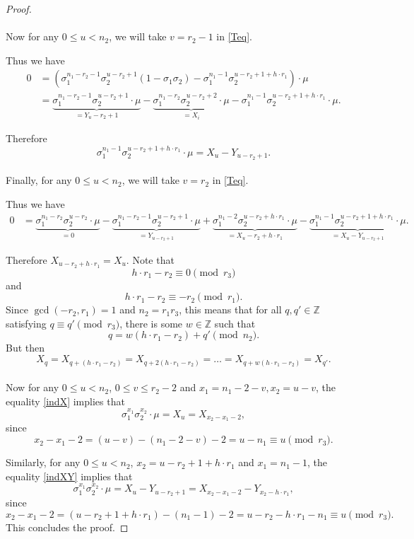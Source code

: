 \documentclass[12pt,a4paper]{article}
\theoremstyle{definition}
\newcommand{\Z}{\mathbb{Z}}
\begin{document}
\begin{proof}
\paragraph*{}
Now for any $0\leq u< n_2$, we will take $v=r_2-1$ in \eqref{Teq}. 

Thus we have 
\begin{align*}
0&=\left(\sigma_1^{n_1-r_2-1}\sigma_2^{u-r_2+1}(1-\sigma_1\sigma_2)-\sigma_1^{n_1-1}\sigma_2^{u-r_2+1+h\cdot r_1}\right)\cdot \mu\\
&=\underbrace{\sigma_1^{n_1-r_2-1}\sigma_2^{u-r_2+1}\cdot\mu}_{=Y_u-r_2+1}-\underbrace{\sigma_1^{n_1-r_2}\sigma_2^{u-r_2+2}\cdot\mu}_{=X_i}-\sigma_1^{n_1-1}\sigma_2^{u-r_2+1+h\cdot r_1}\cdot \mu.
\end{align*}

Therefore
\begin{equation}\label{indXY}
\sigma_1^{n_1-1}\sigma_2^{u-r_2+1+h\cdot r_1}\cdot \mu = X_u -Y_{u-r_2+1}.
\end{equation}
\paragraph*{}
Finally, for any $0\leq u< n_2$, we will take $v=r_2$ in \eqref{Teq}. 

Thus we have 
\begin{align*}
0&=\underbrace{\sigma_1^{n_1-r_2}\sigma_2^{u-r_2}\cdot\mu}_{=0}-\underbrace{\sigma_1^{n_1-r_2-1}\sigma_2^{u-r_2+1}\cdot\mu}_{=Y_{u-r_2+1}}
+\underbrace{\sigma_1^{n_1-2}\sigma_2^{u-r_2+h\cdot r_1}\cdot \mu}_{=X_u-r_2+h\cdot r_1}-\underbrace{\sigma_1^{n_1-1}\sigma_2^{u-r_2+1+h\cdot r_1}\cdot \mu}_{=X_u-Y_{u-r_2+1}}.
\end{align*}

Therefore $X_{u -r_2+h\cdot r_1}=X_u$. Note that $$h\cdot r_1-r_2\equiv 0 \pmod{r_3}$$ and $$h\cdot r_1-r_2\equiv -r_2\pmod{r_1}.$$ Since $\gcd(-r_2,r_1)=1$ and $n_2=r_1r_3$, this means that for all $q,q'\in\Z$ satisfying $q\equiv q'\pmod{r_3}$, there is some $w\in\Z$ such that $$q=w(h\cdot r_1-r_2)+q' \pmod{n_2}.$$ But then $$X_q=X_{q+(h\cdot r_1-r_2)}=X_{q+2(h\cdot r_1-r_2)}=\dots=X_{q+w(h\cdot r_1-r_2)}=X_{q'}.$$

\paragraph*{}
Now for any $0\leq u<n_2$, $0\leq v\leq r_2-2$ and $x_1=n_1-2-v,x_2=u-v$, the equality \eqref{indX} implies that $$\sigma_1^{x_1}\sigma_2^{x_2}\cdot \mu=X_u=X_{x_2-x_1-2},$$ since $$x_2-x_1-2=(u-v)-(n_1-2-v)-2=u-n_1\equiv u\pmod {r_3}.$$

Similarly, for any $0\leq u<n_2$, $x_2=u-r_2+1+h\cdot r_1$ and $x_1=n_1-1$, the equality \eqref{indXY} implies that 
$$\sigma_1^{x_1}\sigma_2^{x_2}\cdot \mu=X_u-Y_{u-r_2+1}=X_{x_2-x_1-2}-Y_{x_2-h\cdot r_1},$$ since 
$$x_2-x_1-2=(u-r_2+1+h\cdot r_1)-(n_1-1)-2=u-r_2-h\cdot r_1-n_1\equiv u \pmod{r_3}.$$
This concludes the proof.
\end{proof}
\end{document}
